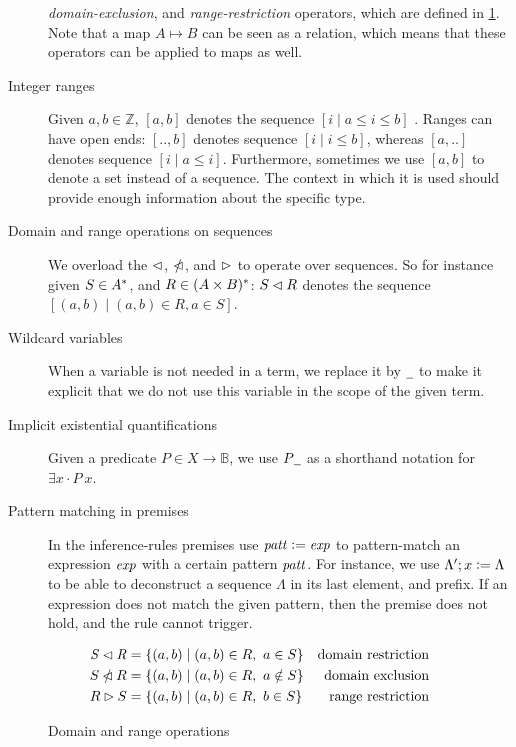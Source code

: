 \begin{description}
  \textit{domain-exclusion}, and \textit{range-restriction} operators, which
  are defined in \cref{fig:domain-and-range-ops}. Note that a map $A \mapsto B$
  can be seen as a relation, which means that these operators can be
  applied to maps as well.
\item[Integer ranges] Given $a, b \in \mathbb{Z}$, $[a, b]$ denotes the
  sequence $[i \mid a \leq i \leq b]$ . Ranges can have open ends: $[.., b]$
  denotes sequence $[i \mid i \leq b]$, whereas $[a, ..]$ denotes sequence
  $[i \mid a \leq i]$. Furthermore, sometimes we use $[a, b]$ to denote a set
  instead of a sequence. The context in which it is used should provide enough
  information about the specific type.
\item[Domain and range operations on sequences] We overload the $\lhd$,
  $\mathbin{\slashed{\lhd}}$, and $\rhd$ to operate over sequences. So for
  instance given $S \in A^{*}$, and $R \in (A \times B)^{*}$:
  $S \lhd R$ denotes the sequence
  $[ (a, b) \mid (a, b) \in R, a \in S]$.
\item[Wildcard variables] When a variable is not needed in a term, we replace
  it by $\wcard$ to make it explicit that we do not use this variable in the
  scope of the given term.
\item[Implicit existential quantifications] Given a predicate
  $P \in X \to \mathbb{B}$, we use $P \wcard$ as a shorthand notation for
  $\exists x \cdot P~x$.

\item[Pattern matching in premises] In the inference-rules premises use
  $\mathit{patt} \mathrel{\mathop:}= \mathit{exp}$ to pattern-match an expression $\mathit{exp} $
  with a certain pattern $\mathit{patt}$. For instance, we use
  $\Lambda'; x \mathrel{\mathop:}= \Lambda$ to be able to deconstruct a sequence $\Lambda$
  in its last element, and prefix. If an expression does not match the given
  pattern, then the premise does not hold, and the rule cannot trigger.
\end{description}

\begin{figure}[htb]
  \begin{align*}
    \mathit{S} \lhd \mathit{R}
    & = \{ (a, b) \mid (a, b) \in R, ~ a \in S \}
    & \text{domain restriction}
    \\
    S \mathbin{\slashed{\lhd}} R
    & = \{ (a, b) \mid (a, b) \in R, ~ a \notin S \}
    & \text{domain exclusion}
    \\
    R \rhd S
    & = \{ (a, b) \mid (a, b) \in R, ~ b \in S \}
    & \text{range restriction}
  \end{align*}
  \caption{Domain and range operations}
  \label{fig:domain-and-range-ops}
\end{figure}